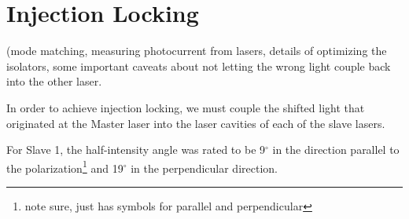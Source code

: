  \chapter{Injection Locking}
 (mode matching, measuring photocurrent from lasers, details of optimizing the isolators, some important caveats about not letting the wrong light couple back into the other laser. 

In order to achieve injection locking, we must couple the shifted light that originated at the Master laser into the laser cavities of each of the slave lasers.

For Slave 1, the half-intensity angle was rated to be 9$^\circ$ in the direction parallel to the polarization\footnote{note sure, just has symbols for parallel and perpendicular} and 19$^\circ$ in the perpendicular direction. 


